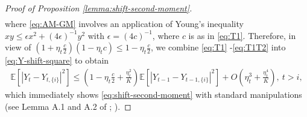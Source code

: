 \documentclass[a4paper,11pt]{article}
\numberwithin{equation}{section}
\theoremstyle{plain}
\theoremstyle{remark}
\def\IE{\mathbb{E}}
\newcommand{\shift}[2]{#1_{#2, \{i\}}}
\begin{document}
\begin{proof}[Proof of Proposition \ref{lemma:shift-second-moment}]
\begin{align}
\end{align}
where \eqref{eq:AM-GM} involves an application of Young's inequality $xy \leq \epsilon x^2 + (4\epsilon)^{-1} y^2 $ with $\epsilon=(4c)^{-1}$, where $c$ is as in \eqref{eq:T1}. Therefore, in view of $(1 + \eta_t \frac{c}{2})(1-\eta_t c)\leq 1 -\eta_t\frac{c}{2}$, we combine \eqref{eq:T1} -\eqref{eq:T1T2} into \eqref{eq:Y-shift-square} to obtain 
\begin{align*}
     \IE[|Y_t -\shift{Y}{t}|^2] \leq (1 -\eta_t \frac{c}{2} + \frac{\eta_t^2}{K}) \IE[|Y_{t-1} -\shift{Y}{t-1}|^2] + O(\eta_t^3+\frac{\eta_t^4}{K}), \ t>i,
\end{align*}
which immediately shows \eqref{eq:shift-second-moment} with standard manipulations  (see Lemma A.1 and A.2 of \cite{zhu-2023}; \cite{polyak1992acceleration}).
\end{proof}
\end{document}
